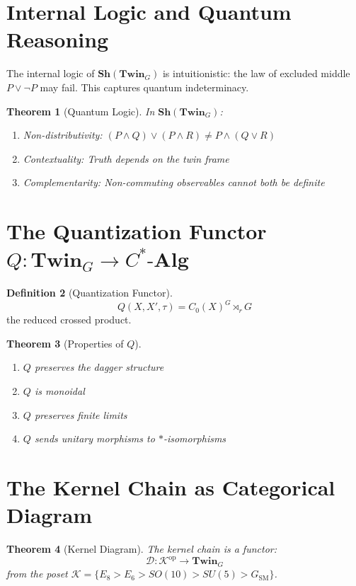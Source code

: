 \documentclass[11pt,a4paper,openright]{book}
\theoremstyle{plain}
\newtheorem{theorem}{Theorem}[chapter]
\theoremstyle{definition}
\newtheorem{definition}[theorem]{Definition}
\newcommand{\SM}{\mathrm{SM}}
\newcommand{\op}{\mathrm{op}}
\newcommand{\Cstar}{C^*}
\newcommand{\Twin}{\mathbf{Twin}}
\newcommand{\Sh}{\mathbf{Sh}}
\begin{document}
\section{Internal Logic and Quantum Reasoning}

The internal logic of $\Sh(\Twin_G)$ is intuitionistic: the law of excluded middle $P \lor \neg P$ may fail. This captures quantum indeterminacy.

\begin{theorem}[Quantum Logic]
In $\Sh(\Twin_G)$:
\begin{enumerate}
    \item Non-distributivity: $(P \land Q) \lor (P \land R) \neq P \land (Q \lor R)$
    \item Contextuality: Truth depends on the twin frame
    \item Complementarity: Non-commuting observables cannot both be definite
\end{enumerate}
\end{theorem}

\section{The Quantization Functor $Q: \Twin_G \to \Cstar\text{-}\mathbf{Alg}$}

\begin{definition}[Quantization Functor]
\begin{equation}
Q(X, X', \tau) = C_0(X)^G \rtimes_r G
\end{equation}
the reduced crossed product.
\end{definition}

\begin{theorem}[Properties of $Q$]
\begin{enumerate}
    \item $Q$ preserves the dagger structure
    \item $Q$ is monoidal
    \item $Q$ preserves finite limits
    \item $Q$ sends unitary morphisms to $*$-isomorphisms
\end{enumerate}
\end{theorem}

\section{The Kernel Chain as Categorical Diagram}

\begin{theorem}[Kernel Diagram]
The kernel chain is a functor:
\begin{equation}
\mathcal{D}: \mathcal{K}^{\op} \to \Twin_G
\end{equation}
from the poset $\mathcal{K} = \{E_8 > E_6 > SO(10) > SU(5) > G_{\SM}\}$.
\end{theorem}
\end{document}
